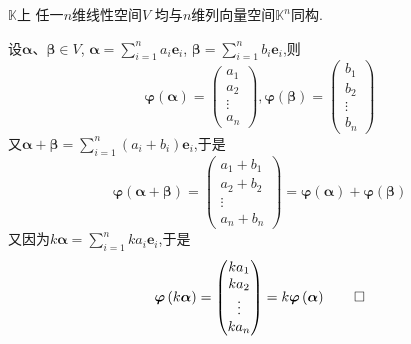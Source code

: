 \begin{formal}
\begin{theorem}[与行、列向量空间同构]\label{thm:与行、列向量空间同构}
    $\mathbb{K}$上
    任一$n$维线性空间$V$
    均与$n$维列向量空间$\mathbb{K}^n$同构.
\end{theorem}
\begin{Proof}
设$\bm{\alpha}$、$\bm{\beta}\in V$,
$\displaystyle
\bm{\alpha}=\sum_{i=1}^{n}a_i\bm{e}_i$,
$\displaystyle
\bm{\beta}=\sum_{i=1}^{n}b_i\bm{e}_i$,则
\[
\bm{\varphi}\left(\bm{\alpha}\right)=\begin{pmatrix}
    a_1\\a_2\\\vdots\\a_n
\end{pmatrix},\bm{\varphi}\left(\bm{\beta}\right)=
\begin{pmatrix}
    b_1\\b_2\\\vdots\\b_n
\end{pmatrix}
\]
又$\displaystyle
\bm{\alpha}+\bm{\beta}=\sum_{i=1}^{n}\left(a_i+b_i\right)\bm{e}_i$,于是
\[
\bm{\varphi}\left(\bm{\alpha}+\bm{\beta}\right)=
\begin{pmatrix}
    a_1+b_1\\a_2+b_2\\\vdots\\a_n+b_n
\end{pmatrix}=\bm{\varphi}\left(\bm{\alpha}\right)+\bm{\varphi}
\left(\bm{\beta}\right)
\]
又因为$\displaystyle
k\bm{\alpha}=\sum_{i=1}^{n}ka_i\bm{e}_i$,于是
\[
\bm{\varphi}\left(k\bm{\alpha}\right)=\begin{pmatrix}
    ka_1\\ka_2\\\vdots\\ka_n
\end{pmatrix}=k\bm{\varphi}\left(\bm{\alpha}\right)
\qedhere
\]
\end{Proof}
\end{formal}
